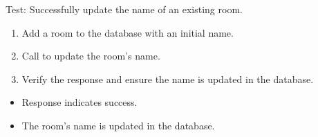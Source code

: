 \documentclass[letterpaper,10pt,english]{sphinxmanual}
\begin{document}
\begin{fulllineitems}
\label{\detokenize{test:test.test_room.test_update_room_name_success}}
\pysigstartsignatures
\pysiglinewithargsret
{}
{}
{}
\pysigstopsignatures
\sphinxAtStartPar
Test: Successfully update the name of an existing room.
\begin{description}
\begin{enumerate}
%
\item {} 
\sphinxAtStartPar
Add a room to the database with an initial name.

\item {} 
\sphinxAtStartPar
Call  to update the room’s name.

\item {} 
\sphinxAtStartPar
Verify the response and ensure the name is updated in the database.

\end{enumerate}

\begin{itemize}
\item {} 
\sphinxAtStartPar
Response indicates success.

\item {} 
\sphinxAtStartPar
The room’s name is updated in the database.

\end{itemize}

\end{description}

\end{fulllineitems}

\end{document}
